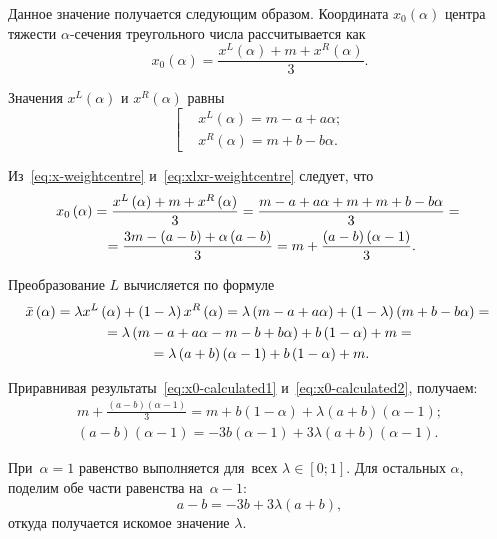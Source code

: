 Данное значение получается следующим образом. Координата $x_0 \left( \alpha  \right)$ центра тяжести $\alpha$-сечения треугольного числа рассчитывается как
\begin{equation}
\label{eq:x-weightcentre}
  x_0\left( \alpha  \right)=\frac{x^L\left( \alpha  \right)+m+x^R\left( \alpha  \right)}{3}.
\end{equation}

Значения $x^L\left( \alpha  \right)$ и $x^R\left( \alpha \right)$ равны
\begin{equation}
\label{eq:xlxr-weightcentre}
  \left[ \begin{aligned}
    & x^L\left( \alpha  \right)=m-a+a\alpha; \\ 
    & x^R\left( \alpha  \right)=m+b-b\alpha.
  \end{aligned} \right.
\end{equation}

Из~\eqref{eq:x-weightcentre} и~\eqref{eq:xlxr-weightcentre} следует, что
\begin{gather}
  x_0\left( \alpha  \right)=\frac{x^L\left( \alpha  \right)+m+x^R\left( \alpha  \right)}{3}=\frac{m-a+a\alpha +m+m+b-b\alpha }{3}={} \notag \\ 
  \label{eq:x0-calculated1}
  {}=\frac{3m-\left( a-b \right)+\alpha \left( a-b \right)}{3}=m+\frac{\left( a-b \right)\left( \alpha -1 \right)}{3}.
\end{gather}

Преобразование $L$ вычисляется по формуле
\begin{gather}
  \bar{x}\left( \alpha  \right)=\lambda x^L\left( \alpha  \right)+\left( 1-\lambda  \right)x^R\left( \alpha  \right)=\lambda \left( m-a+a\alpha  \right)+\left( 1-\lambda  \right)\left( m+b-b\alpha  \right)={} \notag \\ 
  {}=\lambda \left( m-a+a\alpha -m-b+b\alpha  \right)+b\left( 1-\alpha  \right)+m={} \notag \\
  \label{eq:x0-calculated2}
  {}=\lambda \left( a+b \right)\left( \alpha -1 \right)+b\left( 1-\alpha  \right)+m.
\end{gather}

Приравнивая результаты~\eqref{eq:x0-calculated1} и~\eqref{eq:x0-calculated2}, получаем:
\begin{gather*}
  m+\frac{\left( a-b \right)\left( \alpha -1 \right)}{3}=m+b\left( 1-\alpha  \right)+\lambda \left( a+b \right)\left( \alpha -1 \right); \\
  \left( a-b \right)\left( \alpha -1 \right)=-3b\left( \alpha -1 \right)+3\lambda \left( a+b \right)\left( \alpha -1 \right).  
\end{gather*}
 
При~$\alpha=1$ равенство выполняется для~всех $\lambda \in \left[ 0; 1\right]$. Для остальных $\alpha$, поделим обе части равенства на~$\alpha-1$:
\begin{equation*}
  a-b=-3b+3\lambda \left( a+b \right),
\end{equation*}
откуда получается искомое значение $\lambda$.